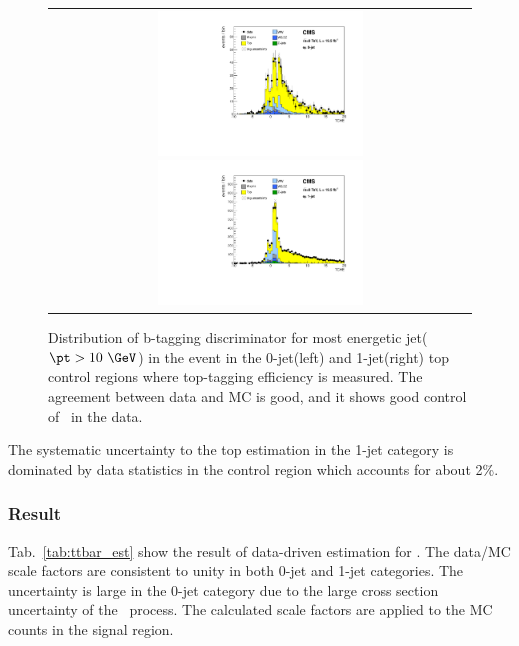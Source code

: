 \begin{figure}[htp]
\begin{tabular}{c}
\\
\includegraphics[width=0.5\textwidth]{figures/topcontrol_tche_of_0j.pdf}
\includegraphics[width=0.5\textwidth]{figures/topcontrol_tche_of_1j.pdf} 
\end{tabular} 
\caption{Distribution of b-tagging discriminator for most energetic jet($\pt>10~\GeV$) 
in the event in the 0-jet(left) and 1-jet(right) top control regions
where top-tagging efficiency is measured. The agreement between data and MC is good, 
and it shows good control of \topbkg\ in the data.} 
\label{fig:TCHE_topCR} 
\end{figure} 

The systematic uncertainty to the top estimation in the 1-jet category 
is dominated by data statistics in the control region which accounts for 
about 2\%.     

\subsubsection{Result}

Tab.~\ref{tab:ttbar_est} show the result of data-driven estimation for \topbkg. 
The data/MC scale factors are consistent to unity in both 0-jet and 1-jet categories. 
The uncertainty is large in the 0-jet category due to the large cross section uncertainty 
of the \tw\ process. The calculated scale factors are applied to the MC counts 
in the signal region.

